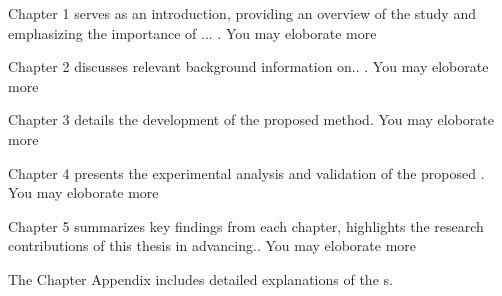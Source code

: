 Chapter 1 serves as an introduction, providing an overview of the study and emphasizing the importance of ... . You may eloborate more

Chapter 2 discusses relevant background information on.. . You may eloborate more

Chapter 3 details the development of the proposed method. You may eloborate more

Chapter 4 presents the experimental analysis and validation of the proposed . You may eloborate more

Chapter 5 summarizes key findings from each chapter, highlights the research contributions of this thesis in advancing.. You may eloborate more


The Chapter Appendix includes detailed explanations of the s.